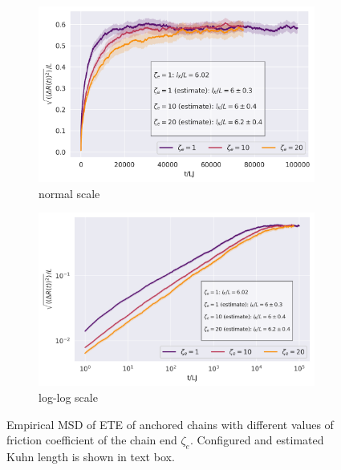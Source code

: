 \documentclass[
    paper=A4,pagesize=automedia,fontsize=12pt,
    BCOR=15mm,DIV=22,
    twoside,headinclude,footinclude=false,
    fleqn,             %
    bibliography=totocnumbered,          %
    listof=totoc,                %
    listof=flat,                 %
    cleardoublepage=empty      %
    numbers=endperiod
]{scrartcl}
\begin{document}
\begin{figure}
    \centering
    \begin{subfigure}[b]{\textwidth}
        \centering
        \includegraphics[width=\textwidth]{14+15+16-exp-msd.png}
        \caption{normal scale}
        \label{fig:msd_anchored_zeta-normal}
    \end{subfigure}
    \begin{subfigure}[b]{\textwidth}
        \centering
        \includegraphics[width=\textwidth]{14+15+16-exp-msd-log.png}
        \caption{log-log scale}
        \label{fig:msd_anchored_zeta-log}
    \end{subfigure}
    \caption{Empirical MSD of ETE of anchored chains with different values of
    friction coefficient of the chain end $\zeta_e$. 
    Configured and estimated Kuhn length is shown in text box.
    }
    \label{fig:msd_anchored_zeta}
\end{figure}
\end{document}
